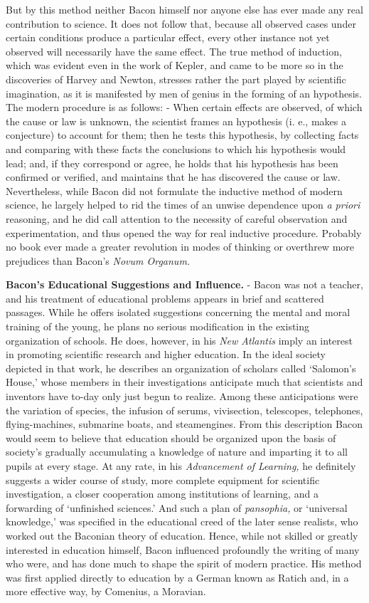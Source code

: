 \documentclass[]{book}
\begin{document}
But by this method neither Bacon himself nor anyone else has ever made any real contribution to science. It does not follow that, because all observed cases under certain conditions produce a particular effect, every other instance not yet observed will necessarily have the same effect. The true method of induction, which was evident even in the work of Kepler, and came to be more so in the discoveries of Harvey and Newton, stresses rather the part played by scientific imagination, as it is manifested by men of genius in the forming of an hypothesis. The modern procedure is as follows: - When certain effects are observed, of which the cause or law is unknown, the scientist frames an hypothesis (i. e., makes a conjecture) to account for them; then he tests this hypothesis, by collecting facts and comparing with these facts the conclusions to which his hypothesis would lead; and, if they correspond or agree, he holds that his hypothesis has been confirmed or verified, and maintains that he has discovered the cause or law. Nevertheless, while Bacon did not formulate the inductive method of modern science, he largely helped to rid the times of an unwise dependence upon \emph{a priori} reasoning, and he did call attention to the necessity of careful observation and experimentation, and thus opened the way for real inductive procedure. Probably no book ever made a greater revolution in modes of thinking or overthrew more prejudices than Bacon's \emph{Novum Organum.}

\textbf{Bacon's Educational Suggestions and Influence.} - Bacon was not a teacher, and his treatment of educational problems appears in brief and scattered passages. While he offers isolated suggestions concerning the mental and moral training of the young, he plans no serious modification in the existing organization of schools. He does, however, in his \emph{New Atlantis} imply an interest in promoting scientific research and higher education. In the ideal society depicted in that work, he describes an organization of scholars called `Salomon's House,' whose members in their investigations anticipate much that scientists and inventors have to-day only just begun to realize. Among these anticipations were the variation of species, the infusion of serums, vivisection, telescopes, telephones, flying-machines, submarine boats, and steamengines. From this description Bacon would seem to believe that education should be organized upon the basis of society's gradually accumulating a knowledge of nature and imparting it to all pupils at every stage. At any rate, in his \emph{Advancement of Learning,} he definitely suggests a wider course of study, more complete equipment for scientific investigation, a closer cooperation among institutions of learning, and a forwarding of `unfinished sciences.' And such a plan of \emph{pansophia,} or `universal knowledge,' was specified in the educational creed of the later sense realists, who worked out the Baconian theory of education. Hence, while not skilled or greatly interested in education himself, Bacon influenced profoundly the writing of many who were, and has done much to shape the spirit of modern practice. His method was first applied directly to education by a German known as Ratich and, in a more effective way, by Comenius, a Moravian.
\end{document}

